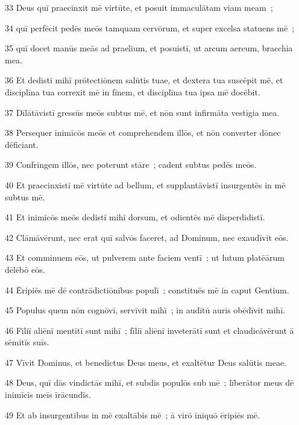 \psalmVerse
  {\phantom{0}33}
  {Deus quī praecinxit mē virtūte, et posuit immaculātam viam meam~;}


\psalmVerse
  {\phantom{0}34}
  {quī perfēcit pedēs meōs tamquam cervōrum, et super excelsa statuens mē~;}


\psalmVerse
  {\phantom{0}35}
  {quī docet manūs meās ad praelium, et posuistī, ut arcum aereum, bracchia mea.}


\psalmVerse
  {\phantom{0}36}
  {Et dedistī mihī prōtectiōnem salūtis tuae, et dextera tua suscēpit mē, et disciplīna tua correxit mē in fīnem, et disciplīna tua ipsa mē docēbit.}


\psalmVerse
  {\phantom{0}37}
  {Dīlātāvistī gressūs meōs subtus mē, et nōn sunt infirmāta vestīgia mea.}


\psalmVerse
  {\phantom{0}38}
  {Persequer inimīcōs meōs et comprehendem illōs, et nōn converter dōnec dēficiant.}


\psalmVerse
  {\phantom{0}39}
  {Confringem illōs, nec poterunt stāre~; cadent subtus pedēs meōs.}


\psalmVerse
  {\phantom{0}40}
  {Et praecinxistī mē virtūte ad bellum, et supplantāvistī insurgentēs in mē subtus mē.}


\psalmVerse
  {\phantom{0}41}
  {Et inimīcōs meōs dedistī mihī dorsum, et odientēs mē disperdidistī.}


\psalmVerse
  {\phantom{0}42}
  {Clāmāvērunt, nec erat quī salvōs faceret, ad Dominum, nec exaudīvit eōs.}


\psalmVerse
  {\phantom{0}43}
  {Et comminuem eōs, ut pulverem ante faciem ventī~; ut lutum platēārum dēlēbō eōs.}


\psalmVerse
  {\phantom{0}44}
  {Ēripiēs mē dē contrādictiōnibus populī~; constituēs mē in caput Gentium.}


\psalmVerse
  {\phantom{0}45}
  {Populus quem nōn cognōvī, servīvit mihī~; in audītū auris obēdīvit mihī.}


\psalmVerse
  {\phantom{0}46}
  {Fīliī aliēnī mentītī sunt mihī~; fīliī aliēnī inveterātī sunt et claudicāvērunt ā sēmitīs suīs.}


\psalmVerse
  {\phantom{0}47}
  {Vīvit Dominus, et benedictus Deus meus, et exaltētur Deus salūtis meae.}


\psalmVerse
  {\phantom{0}48}
  {Deus, quī dās vindictās mihī, et subdis populōs sub mē~; līberātor meus dē inimīcīs meīs īrācundīs.}


\psalmVerse
  {\phantom{0}49}
  {Et ab insurgentibus in mē exaltābis mē~; ā virō inīquō ēripiēs mē.}


